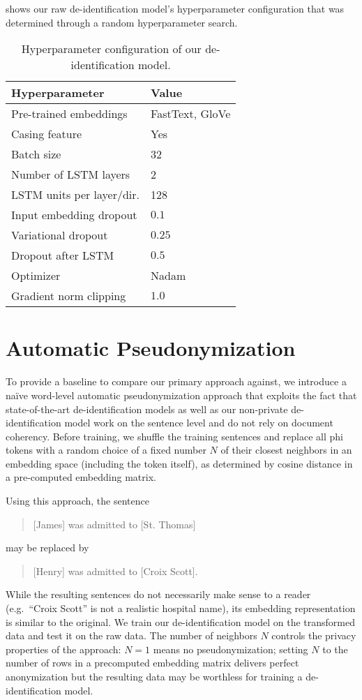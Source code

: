 %
 shows our raw de-identification model's hyperparameter configuration that was determined through a random hyperparameter search.

\begin{table}
    \centering
    \begin{tabular}{ll}
     \toprule
     Hyperparameter & Value\\
     \midrule
     Pre-trained embeddings & FastText, GloVe\\
     Casing feature & Yes\\
     Batch size & 32\\
     Number of LSTM layers & 2\\
     LSTM units per layer/dir. & 128\\
     Input embedding dropout & $0.1$\\
     Variational dropout & $0.25$\\
     Dropout after LSTM & $0.5$\\
     Optimizer & Nadam\\
     Gradient norm clipping & $1.0$\\
     \bottomrule
    \end{tabular}
    \caption{Hyperparameter configuration of our de-identification model.}\label{tab:deid-hyperparameters}
\end{table}


\section{Automatic Pseudonymization}\label{sec:automatic-pseudonymization}
%
To provide a baseline to compare our primary approach against, we introduce a naïve word-level automatic pseudonymization approach that exploits the fact that state-of-the-art de-identification models \citep{liu2017identification,dernoncourt2017identification} as well as our non-private de-identification model work on the sentence level and do not rely on document coherency.
%
Before training, we shuffle the training sentences and replace all \ac{phi} tokens with a random choice of a fixed number $N$ of their closest neighbors in an embedding space (including the token itself), as determined by cosine distance in a pre-computed embedding matrix.

%
Using this approach, the sentence
%
\begin{quote}
    [James] was admitted to [St. Thomas]
\end{quote}
%
may be replaced by
\begin{quote}
    [Henry] was admitted to [Croix Scott].
\end{quote}
%
While the resulting sentences do not necessarily make sense to a reader (e.g.\ ``Croix Scott'' is not a realistic hospital name), its embedding representation is similar to the original.
%
We train our de-identification model on the transformed data and test it on the raw data.
%
The number of neighbors $N$ controls the privacy properties of the approach: $N = 1$ means no pseudonymization; setting $N$ to the number of rows in a precomputed embedding matrix delivers perfect anonymization but the resulting data may be worthless for training a de-identification model.


